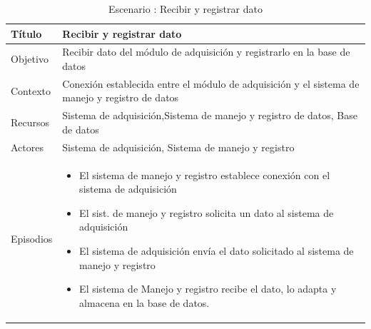 \begin{table}[h!]
		\centering
		\begin{tabular}{>{\columncolor[gray]{.8}} p{4cm} |p{9.5cm} }
		\hline
		Título  & Recibir y registrar dato\\
		\hline
		Objetivo &  Recibir dato del módulo de adquisición y registrarlo en la base de datos \\
		\hline
		Contexto & Conexión establecida entre el módulo de adquisición y el sistema de manejo y registro de datos\\
		\hline
		Recursos &  Sistema de adquisición,Sistema de manejo y registro de datos, Base de datos\\
		\hline
		Actores & Sistema de adquisición, Sistema de manejo y registro\\
		\hline
		Episodios &  \begin{itemize}
						\item El sistema de manejo y registro establece conexión con el sistema de adquisición
						\item El sist. de manejo y registro solicita un dato al sistema de adquisición
						\item El sistema de adquisición envía el dato solicitado al sistema de manejo y registro
						\item El sistema de Manejo y registro recibe el dato, lo adapta y almacena en la base de datos.
					\end{itemize} \\	
		\hline
		\end{tabular}
		\caption{Escenario : Recibir y registrar dato}
		\end{table}


